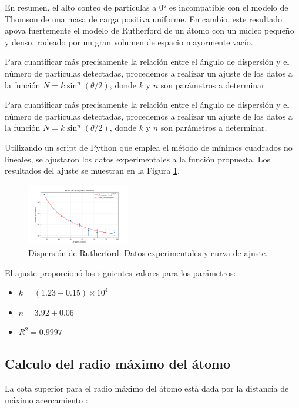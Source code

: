 \documentclass[twocolumn,a4paper,11pt]{scrartcl}
\begin{document}
En resumen, el alto conteo de partículas a 0° es incompatible con el modelo de Thomson de una masa de carga positiva uniforme. En cambio, este resultado apoya fuertemente el modelo de Rutherford de un átomo con un núcleo pequeño y denso, rodeado por un gran volumen de espacio mayormente vacío.

Para cuantificar más precisamente la relación entre el ángulo de dispersión y el número de partículas detectadas, procedemos a realizar un ajuste de los datos a la función $N = k \sin^n (\theta/2)$, donde $k$ y $n$ son parámetros a determinar.

Para cuantificar más precisamente la relación entre el ángulo de dispersión y el número de partículas detectadas, procedemos a realizar un ajuste de los datos a la función $N = k \sin^n (\theta/2)$, donde $k$ y $n$ son parámetros a determinar.

Utilizando un script de Python que emplea el método de mínimos cuadrados no lineales, se ajustaron los datos experimentales a la función propuesta. Los resultados del ajuste se muestran en la Figura \ref{fig:rutherford_fit}.

\begin{figure}[h]
\centering
\includegraphics[width=0.4\textwidth]{data_fit.png}
\caption{Dispersión de Rutherford: Datos experimentales y curva de ajuste.}
\label{fig:rutherford_fit}
\end{figure}

El ajuste proporcionó los siguientes valores para los parámetros:

\begin{itemize}
    \item $k = (1.23 \pm 0.15) \times 10^4$
    \item $n = 3.92 \pm 0.06$
    \item $R^2 = 0.9997$
\end{itemize}

\subsection*{Calculo del radio máximo del átomo}
La cota superior para el radio máximo del átomo está dada por la distancia de máximo acercamiento \cite{Wikipedia_Rutherford}:
\end{document}
